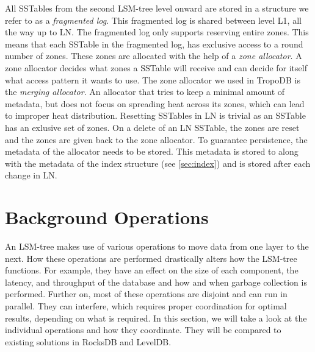 All SSTables from the second LSM-tree level onward are stored in a structure we refer to as a \textit{fragmented log}. This fragmented log is shared between level L1, all the way up to LN. The fragmented log only supports reserving entire zones. This means that each SSTable in the fragmented log, has exclusive access to a round number of zones. These zones are allocated with the help of a \textit{zone allocator}. A zone allocator decides what zones a SSTable will receive and can decide for itself what access pattern it wants to use. The zone allocator we used in TropoDB is the \textit{merging allocator}. An allocator that tries to keep a minimal amount of metadata, but does not focus on spreading heat across its zones, which can lead to improper heat distribution. Resetting SSTables in LN is trivial as an SSTable has an exlusive set of zones. On a delete of an LN SSTable, the zones are reset and the zones are given back to the zone allocator. To guarantee persistence, the metadata of the allocator needs to be stored. This metadata is stored to along with the metadata of the index structure (see \autoref{sec:index}) and is stored after each change in LN. 

\section{Background Operations}
\label{sec:desback}
An LSM-tree makes use of various operations to move data from one layer to the next. How these operations are performed drastically alters how the LSM-tree functions. For example, they have an effect on the size of each component, the latency, and throughput of the database and how and when garbage collection is performed. Further on, most of these operations are disjoint and can run in parallel. They can interfere, which requires proper coordination for optimal results, depending on what is required. In this section, we will take a look at the individual operations and how they coordinate. They will be compared to existing solutions in RocksDB and LevelDB.

